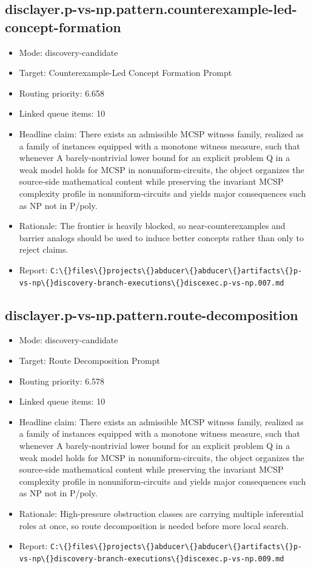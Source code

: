 \documentclass[11pt]{article}
\begin{document}
\subsection*{disclayer.p-vs-np.pattern.counterexample-led-concept-formation}
\begin{itemize}
\item Mode: discovery-candidate
\item Target: Counterexample-Led Concept Formation Prompt
\item Routing priority: 6.658
\item Linked queue items: 10
\item Headline claim: There exists an admissible MCSP witness family, realized as a family of instances equipped with a monotone witness measure, such that whenever A barely-nontrivial lower bound for an explicit problem Q in a weak model holds for MCSP in nonuniform-circuits, the object organizes the source-side mathematical content while preserving the invariant MCSP complexity profile in nonuniform-circuits and yields major consequences such as NP not in P/poly.
\item Rationale: The frontier is heavily blocked, so near-counterexamples and barrier analogs should be used to induce better concepts rather than only to reject claims.
\item Report: \texttt{C:\textbackslash\{\}files\textbackslash\{\}projects\textbackslash\{\}abducer\textbackslash\{\}abducer\textbackslash\{\}artifacts\textbackslash\{\}p-vs-np\textbackslash\{\}discovery-branch-executions\textbackslash\{\}discexec.p-vs-np.007.md}
\end{itemize}

\subsection*{disclayer.p-vs-np.pattern.route-decomposition}
\begin{itemize}
\item Mode: discovery-candidate
\item Target: Route Decomposition Prompt
\item Routing priority: 6.578
\item Linked queue items: 10
\item Headline claim: There exists an admissible MCSP witness family, realized as a family of instances equipped with a monotone witness measure, such that whenever A barely-nontrivial lower bound for an explicit problem Q in a weak model holds for MCSP in nonuniform-circuits, the object organizes the source-side mathematical content while preserving the invariant MCSP complexity profile in nonuniform-circuits and yields major consequences such as NP not in P/poly.
\item Rationale: High-pressure obstruction classes are carrying multiple inferential roles at once, so route decomposition is needed before more local search.
\item Report: \texttt{C:\textbackslash\{\}files\textbackslash\{\}projects\textbackslash\{\}abducer\textbackslash\{\}abducer\textbackslash\{\}artifacts\textbackslash\{\}p-vs-np\textbackslash\{\}discovery-branch-executions\textbackslash\{\}discexec.p-vs-np.009.md}
\end{itemize}
\end{document}
